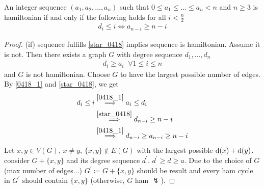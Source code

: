 \documentclass[aagt.tex]{subfiles}
\begin{document}
\begin{theorem}[Chvátal 1972]\label{th_3_9}
  An integer sequence $(a_1,a_2,\dots,a_n)$ such that $0 \leq a_1 \leq \dots \leq a_n < n$ and $n \geq 3$ is hamiltonian if and only if the following holds for all $i < \frac{n}{2}$
  \begin{align}\label{star_0418}
    d_i \leq i \iff a_{n-i} \geq n-i
  \end{align}
\end{theorem}

\begin{proof}
  (if) sequence fulfills \ref{star_0418} implies sequence is hamiltonian.
  Assume it is not. Then there exists a graph $G$ with degree sequence $d_1,\dots,d_n$
  \begin{align}\label{0418_1}
    d_i \geq a_i \;\; \forall 1 \leq i \leq n
  \end{align}
  and $G$ is not hamiltonian.
  Choose $G$ to have the largest possible number of edges.
  By \ref{0418_1} and \ref{star_0418}, we get
  \begin{align}\label{0418_2}
    d_i \leq i &\overset{\ref{0418_1}}{\implies} a_i \leq d_i \\
    &\overset{\ref{star_0418}}{\implies} d_{n-i} \geq n-i \\
    &\overset{\ref{0418_1}}{\implies} d_{n-i} \geq a_{n-i} \geq n-i
  \end{align}
  Let $x,y \in V(G)$, $x \neq y$, $\{x,y\} \notin E(G)$ with the largest possible $\operatorname{d}(x) + \operatorname{d}(y)$.
  consider $G + \{x,y\}$ and its degree sequence $d^\prime$. $d^\prime \geq d \geq a$.
  Due to the choice of $G$ (max number of edges...)
  $G^\prime \coloneqq G + \{x,y\}$ should be result and every ham cycle in $G^\prime$ should contain $\{x,y\}$ (otherwise, $G$ ham $\lightning$).
\end{proof}
\end{document}
